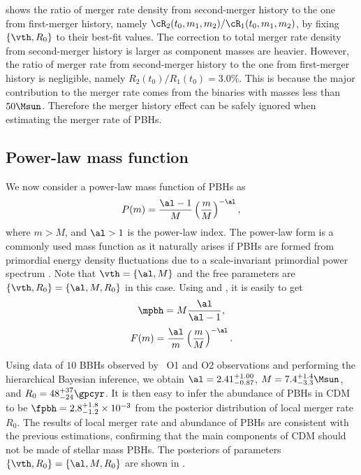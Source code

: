 \documentclass[
reprint,           %
superscriptaddress,%
amsmath,           %
amssymb,           %
aps,               %
prd,               %
notitlepage,       %
longbibliography,  %
floatfix,          %
showkeys,          %
]{revtex4-1}
\def\({\left(}
\def\){\right)}
\def\e{\begin{equation}}
\def\q{\end{equation}}
\begin{document}
 shows the ratio of merger rate density from second-merger history
to the one from first-merger history, namely 
$\cR_2(t_0, m_1, m_2)/\cR_1(t_0, m_1, m_2)$, by fixing $\{\vth, R_0\}$ to their best-fit values.
The correction to total merger rate density from 
second-merger history is larger as component masses are heavier.
However, the ratio of merger rate from 
second-merger history to the one from first-merger history is negligible, namely
$R_2(t_0)/R_1(t_0) = 3.0\%$.
This is because the major contribution to the merger rate comes from the binaries with masses less than $50\Msun$.
Therefore the merger history effect can be safely ignored
when estimating the merger rate of PBHs.

\subsection{Power-law mass function}
We now consider a power-law mass function of PBHs as \cite{Carr:1975qj}
\e\label{power} 
    P(m) = \frac{\al-1}{M} \(\frac{m}{M}\)^{-\al},
\q
where $m>M$, and $\al>1$ is the power-law index. The power-law form is a commonly used mass function as it naturally arises if PBHs are formed from primordial energy density fluctuations due to a scale-invariant primordial power spectrum \cite{Carr:2016drx,Carr:2017jsz}.
Note that $\vth=\{\al, M\}$ and the free parameters are 
$\{\vth, R_0\} = \{\al, M, R_0\}$ in this case. 
Using  and , it is easily to get
\e
    \mpbh = M \frac{\al}{\al-1},
\q
\e 
    F(m) = \frac{\al}{m} \(\frac{m}{M}\)^{-\al}.
\q

Using data of $10$ BBHs observed by \lvc\ O1 and O2 observations and performing
the hierarchical Bayesian inference, we obtain $\al = 2.41^{+1.00}_{-0.87}$,
$M = 7.4^{+1.4}_{-3.3} \Msun$, and $R_0 = 48^{+37}_{-24} \gpcyr$.
It is then easy to infer the abundance of PBHs in CDM to be 
$\fpbh = 2.8^{+1.8}_{-1.2} \times 10^{-3}$ from the posterior distribution of local merger rate $R_0$.
The results of local merger rate and abundance of PBHs are consistent with
the previous estimations, confirming that the main components of CDM should
not be made of stellar mass PBHs.
The posteriors of parameters $\{\vth, R_0\} = \{\al, M, R_0\}$ are shown 
in .
\end{document}
